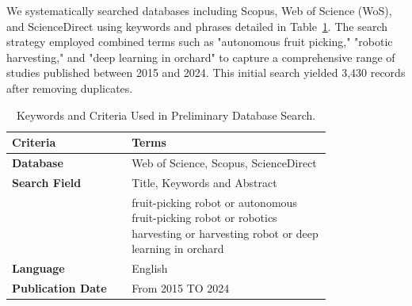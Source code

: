 \documentclass[a4paper,fleqn]{cas-dc}
\begin{document}
We systematically searched databases including Scopus, Web of Science (WoS), and ScienceDirect using keywords and phrases detailed in Table~\ref{tab:keywords}. The search strategy employed combined terms such as "autonomous fruit picking," "robotic harvesting," and "deep learning in orchard" to capture a comprehensive range of studies published between 2015 and 2024. This initial search yielded 3,430 records after removing duplicates.


\begin{table}[ht]
\small
\caption{Keywords and Criteria Used in Preliminary Database Search.} 
\label{tab:keywords} 
\begin{tabular}{p{0.3\linewidth} p{0.5\linewidth}}
\hline
\textbf{Criteria} & \textbf{Terms} \\ \hline
\textbf{Database}  &  Web of Science, Scopus, ScienceDirect \\
\textbf{Search Field} & Title, Keywords and Abstract\\
 & fruit-picking robot or autonomous fruit-picking robot  or robotics harvesting or harvesting robot or deep learning in orchard\\
\textbf{Language} & English \\
\textbf{Publication Date} & From 2015 TO 2024 \\ \hline 
\end{tabular}
\end{table}
\end{document}
